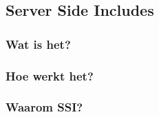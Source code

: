 \documentclass{article}
\begin{document}
	\subsection{Server Side Includes} 
	\subsubsection{Wat is het?}
	
	\subsubsection{Hoe werkt het?}
	
	\subsubsection{Waarom SSI?}
\end{document}
